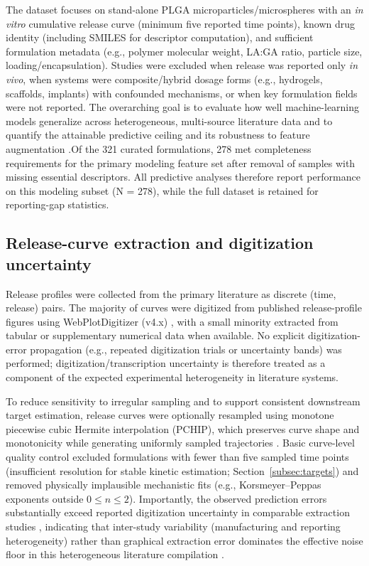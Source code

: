 \documentclass[preprint,12pt,authoryear]{elsarticle}
\begin{document}
The dataset focuses on stand-alone PLGA microparticles/microspheres with an \textit{in vitro} cumulative release curve (minimum five reported time points), known drug identity (including SMILES for descriptor computation), and sufficient formulation metadata (e.g., polymer molecular weight, LA:GA ratio, particle size, loading/encapsulation). Studies were excluded when release was reported only \textit{in vivo}, when systems were composite/hybrid dosage forms (e.g., hydrogels, scaffolds, implants) with confounded mechanisms, or when key formulation fields were not reported. The overarching goal is to evaluate how well machine-learning models generalize across heterogeneous, multi-source literature data and to quantify the attainable predictive ceiling and its robustness to feature augmentation \citep{ICHQ8R2,Bannigan2021,Bannigan2023LAI,Bao2025IJP}.Of the 321 curated formulations, 278 met completeness requirements for the primary modeling feature set after removal of samples with missing essential descriptors. All predictive analyses therefore report performance on this modeling subset (N = 278), while the full dataset is retained for reporting-gap statistics.


\subsection{Release-curve extraction and digitization uncertainty}
Release profiles were collected from the primary literature as discrete (time, release) pairs. The majority of curves were digitized from published release-profile figures using WebPlotDigitizer (v4.x) \citep{Rohatgi2022WebPlotDigitizer}, with a small minority extracted from tabular or supplementary numerical data when available. No explicit digitization-error propagation (e.g., repeated digitization trials or uncertainty bands) was performed; digitization/transcription uncertainty is therefore treated as a component of the expected experimental heterogeneity in literature systems.

To reduce sensitivity to irregular sampling and to support consistent downstream target estimation, release curves were optionally resampled using monotone piecewise cubic Hermite interpolation (PCHIP), which preserves curve shape and monotonicity while generating uniformly sampled trajectories \citep{FritschCarlson1980,Virtanen2020SciPy}. Basic curve-level quality control excluded formulations with fewer than five sampled time points (insufficient resolution for stable kinetic estimation; Section~\ref{subsec:targets}) and removed physically implausible mechanistic fits (e.g., Korsmeyer--Peppas exponents outside $0 \le n \le 2$). Importantly, the observed prediction errors substantially exceed reported digitization uncertainty in comparable extraction studies \citep{Drevon2017WPD}, indicating that inter-study variability (manufacturing and reporting heterogeneity) rather than graphical extraction error dominates the effective noise floor in this heterogeneous literature compilation \citep{Fredenberg2011,FreibergZhu2004}.
\end{document}
